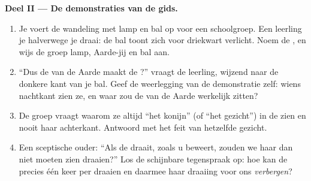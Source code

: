 \begin{problem}
\medskip\noindent\textbf{Deel II --- De demonstraties van de gids.}
\begin{enumerate}[resume]
  \item Je voert de wandeling met lamp en bal op voor een
        schoolgroep. Een leerling  je halverwege je draai: de
        bal toont zich voor driekwart verlicht. Noem de
        , en wijs de groep lamp, Aarde-jij en bal aan.
  \item ``Dus de  van de Aarde maakt de
        ?'' vraagt de leerling, wijzend naar de donkere
        kant van je bal. Geef de weerlegging van de demonstratie zelf:
        wiens nachtkant zien ze, en waar zou de  van de Aarde
        werkelijk zitten?
  \item De groep vraagt waarom ze altijd ``het konijn'' (of ``het
        gezicht'') in de  zien en nooit haar achterkant. Antwoord
        met het feit van hetzelfde gezicht.
  \item Een sceptische ouder: ``Als de  draait, zoals u beweert,
        zouden we haar dan niet moeten zien draaien?'' Los de
        schijnbare tegenspraak op: hoe kan de  precies één keer
        per  draaien en daarmee haar draaiing voor ons
        \emph{verbergen}?
\end{enumerate}


\end{problem}
